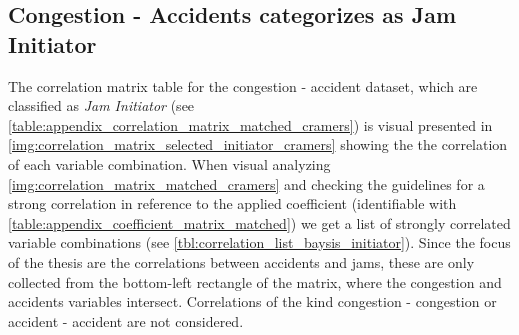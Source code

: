 \subsection{Congestion - Accidents categorizes as Jam Initiator}
\label{analysis_processing_correlation_baysis_initiator}
The correlation matrix table for the congestion - accident dataset, which are classified as \textit{Jam Initiator} (see \cref{table:appendix_correlation_matrix_matched_cramers}) is visual presented in \cref{img:correlation_matrix_selected_initiator_cramers} showing the the correlation of each variable combination. When visual analyzing \cref{img:correlation_matrix_matched_cramers} and checking the guidelines for a strong correlation in reference to the applied coefficient (identifiable with \cref{table:appendix_coefficient_matrix_matched}) we get a list of strongly correlated variable combinations (see \cref{tbl:correlation_list_baysis_initiator}). Since the focus of the thesis are the correlations between accidents and jams, these are only collected from the bottom-left rectangle of the matrix, where the congestion and accidents variables intersect. Correlations of the kind congestion - congestion or accident - accident are not considered.

